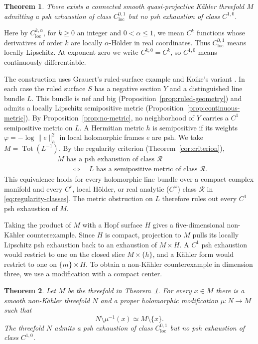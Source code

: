 \documentclass[11pt]{amsart}
\newtheorem{theorem}{Theorem}[section]
\theoremstyle{definition}
\theoremstyle{remark}
\numberwithin{equation}{section}
\newcommand{\Tot}{\operatorname{Tot}}
\begin{document}
\begin{theorem}\label{thm:main}
There exists a connected smooth quasi-projective K\"ahler threefold
$M$ admitting a psh exhaustion of class $C^{0,1}_{\mathrm{loc}}$
but no psh exhaustion of class $C^{1,0}$.
\end{theorem}

Here by $C^{k,\alpha}_{\mathrm{loc}}$, for $k\ge0$ an integer and
$0<\alpha\le1$, we mean $C^k$ functions whose derivatives of order $k$
are locally $\alpha$-H\"older in real coordinates. Thus
$C^{0,1}_{\mathrm{loc}}$ means locally Lipschitz. At exponent zero
we write $C^{k,0}=C^k$, so $C^{1,0}$ means continuously differentiable.

The construction uses Grauert's ruled-surface example
\cite[\S4, 8(d)]{Grauert1962} and Koike's variant
\cite[Example~4.1]{Koike2021}. In each case the ruled surface $S$ has a
negative section $Y$ and a distinguished line bundle $L$. This bundle
is nef and big (Proposition~\ref{prop:ruled-geometry}) and admits a
locally Lipschitz semipositive metric (Proposition~\ref{prop:continuous-metric}).
By Proposition~\ref{prop:no-metric}, no neighborhood of $Y$ carries
a $C^1$ semipositive metric on $L$. A Hermitian metric $h$ is
semipositive if its weights
$\varphi=-\log\|e\|_h^2$ in local holomorphic frames $e$ are psh.
We take $M=\Tot(L^{-1})$. By the regularity criterion
(Theorem~\ref{cor:criterion}),
\[
\begin{aligned}
&M\text{ has a psh exhaustion of class }\mathcal R
\\&\qquad\Longleftrightarrow\quad
L\text{ has a semipositive metric of class }\mathcal R.
\end{aligned}
\]
This equivalence holds for every holomorphic line bundle over a compact
complex manifold and every $C^r$, local H\"older, or real analytic
($C^\omega$) class $\mathcal R$ in \eqref{eq:regularity-classes}.
The metric obstruction on $L$ therefore rules out every $C^1$ psh
exhaustion of $M$.

Taking the product of $M$ with a Hopf surface $H$ gives a
five-dimensional non-K\"ahler counterexample. Since $H$ is compact,
projection to $M$ pulls its locally Lipschitz psh exhaustion back to
an exhaustion of $M\times H$. A $C^1$ psh exhaustion would restrict
to one on the closed slice $M\times\{h\}$, and a K\"ahler form would
restrict to one on $\{m\}\times H$. To obtain a non-K\"ahler
counterexample in dimension three, we use a modification with a
compact center.

\begin{theorem}\label{thm:nonkahler-threefold}
Let $M$ be the threefold in Theorem~\ref{thm:main}.
For every $x\in M$ there is a smooth non-K\"ahler threefold $N$ and a
proper holomorphic modification $\mu:N\to M$ such that
\[
N\setminus\mu^{-1}(x)\simeq M\setminus\{x\}.
\]
The threefold $N$ admits a psh exhaustion of class $C^{0,1}_{\mathrm{loc}}$
but no psh exhaustion of class $C^{1,0}$.
\end{theorem}
\end{document}
